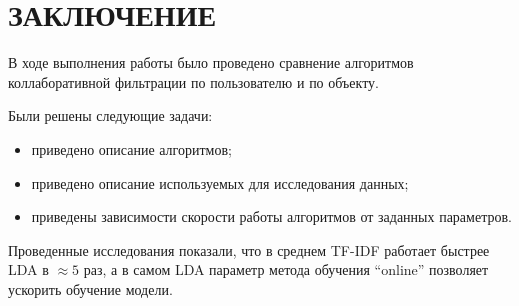 \section*{ЗАКЛЮЧЕНИЕ}
В ходе выполнения работы было проведено сравнение алгоритмов коллаборативной фильтрации по пользователю и по объекту.

Были решены следующие задачи:
\begin{itemize}
	\item приведено описание алгоритмов;
	\item приведено описание используемых для исследования данных;
	\item приведены зависимости скорости работы алгоритмов от заданных параметров.
\end{itemize}

Проведенные исследования показали, что в среднем TF-IDF работает быстрее LDA в $\approx5$ раз, а в самом LDA параметр метода обучения ``online'' позволяет ускорить обучение модели.

\pagebreak